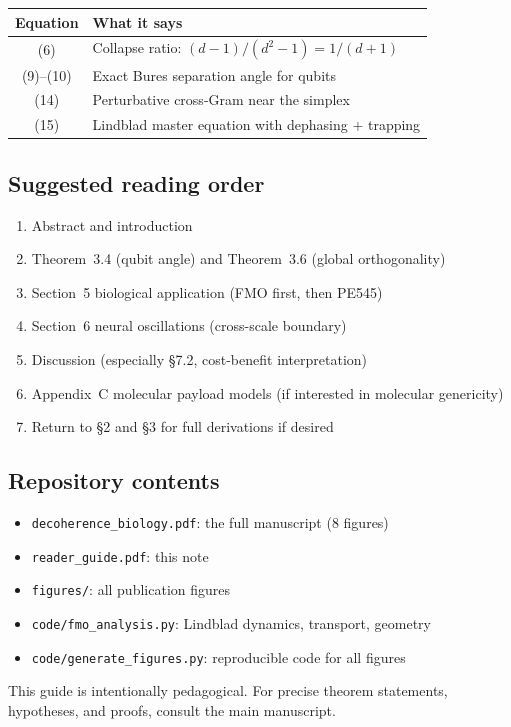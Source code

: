 \documentclass[11pt,a4paper]{article}
\begin{document}
\begin{table}[ht]
\centering
\begin{tabular}{@{}cp{}@{}}
\toprule
\textbf{Equation} & \textbf{What it says} \\
\midrule
(6) & Collapse ratio: $(d{-}1)/(d^2{-}1) = 1/(d{+}1)$ \\
(9)--(10) & Exact Bures separation angle for qubits \\
(14) & Perturbative cross-Gram near the simplex \\
(15) & Lindblad master equation with dephasing + trapping \\
\bottomrule
\end{tabular}
\end{table}

\subsection*{Suggested reading order}

\begin{enumerate}[leftmargin=1.5em]
\item Abstract and introduction
\item Theorem~3.4 (qubit angle) and Theorem~3.6 (global orthogonality)
\item Section~5 biological application (FMO first, then PE545)
\item Section~6 neural oscillations (cross-scale boundary)
\item Discussion (especially \S7.2, cost-benefit interpretation)
\item Appendix~C molecular payload models (if interested in molecular genericity)
\item Return to \S2 and \S3 for full derivations if desired
\end{enumerate}

\subsection*{Repository contents}

\begin{itemize}[leftmargin=1.5em]
\item \texttt{decoherence\_biology.pdf}: the full manuscript (8 figures)
\item \texttt{reader\_guide.pdf}: this note
\item \texttt{figures/}: all publication figures
\item \texttt{code/fmo\_analysis.py}: Lindblad dynamics, transport, geometry
\item \texttt{code/generate\_figures.py}: reproducible code for all figures
\end{itemize}

\vfill

\begin{center}
\small
This guide is intentionally pedagogical.  For precise theorem statements, hypotheses, and proofs, consult the main manuscript.
\end{center}
\end{document}
